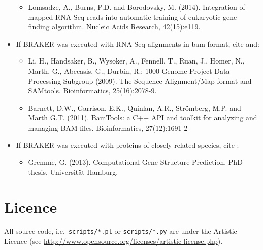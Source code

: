 \documentclass[]{article}
\providecommand{\tightlist}{%
  \setlength{\itemsep}{0pt}\setlength{\parskip}{0pt}}
\begin{document}
\begin{itemize}
  \begin{itemize}
  \tightlist
  \item
    Lomsadze, A., Burns, P.D. and Borodovsky, M. (2014). Integration of
    mapped RNA-Seq reads into automatic training of eukaryotic gene
    finding algorithm. Nucleic Acids Research, 42(15):e119.
  \end{itemize}
\item
  If BRAKER was executed with RNA-Seq alignments in bam-format, cite
  and:

  \begin{itemize}
  \item
    Li, H., Handsaker, B., Wysoker, A., Fennell, T., Ruan, J., Homer,
    N., Marth, G., Abecasis, G., Durbin, R.; 1000 Genome Project Data
    Processing Subgroup (2009). The Sequence Alignment/Map format and
    SAMtools. Bioinformatics, 25(16):2078-9.
  \item
    Barnett, D.W., Garrison, E.K., Quinlan, A.R., Strömberg, M.P. and
    Marth G.T. (2011). BamTools: a C++ API and toolkit for analyzing and
    managing BAM files. Bioinformatics, 27(12):1691-2
  \end{itemize}
\item
  If BRAKER was executed with proteins of closely related species, cite
  :

  \begin{itemize}
  \tightlist
  \item
    Gremme, G. (2013). Computational Gene Structure Prediction. PhD
    thesis, Universität Hamburg.
  \end{itemize}
\end{itemize}

\section{Licence}\label{licence}

All source code, i.e.~\texttt{scripts/*.pl} or \texttt{scripts/*.py} are
under the Artistic Licence (see
\url{http://www.opensource.org/licenses/artistic-license.php}).



\end{document}
